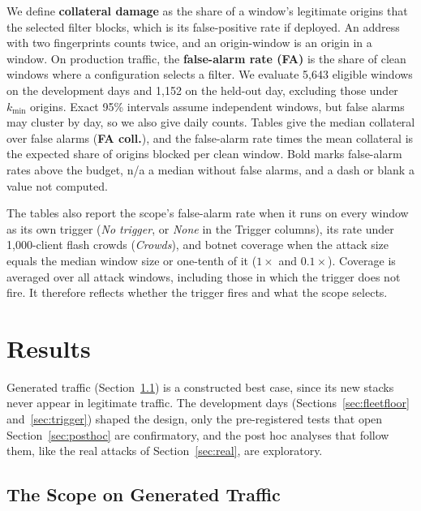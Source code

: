 \documentclass[conference,letterpaper,10pt]{IEEEtran}
\newcommand\1{\textit{(i)}}
\newcommand\2{\textit{(ii)}}
\newcommand\3{\textit{(iii)}}
\newcommand\4{\textit{(iv)}}
\newcommand\5{\textit{(v)}}
\newcommand\6{\textit{(vi)}}
\newcommand\7{\textit{(vii)}}
\newcommand\8{\textit{(viii)}}
\newcommand\9{\textit{(ix)}}
\begin{document}
We define \textbf{collateral damage} as the share of a window's legitimate origins that the selected filter blocks, which is its false-positive rate if deployed. An address with two fingerprints counts twice, and an origin-window is an origin in a window. On production traffic, the \textbf{false-alarm rate (FA)} is the share of clean windows where a configuration selects a filter. We evaluate 5,643 eligible windows on the development days and 1,152 on the held-out day, excluding those under $k_{\min}$ origins. Exact 95\% intervals assume independent windows, but false alarms may cluster by day, so we also give daily counts. Tables give the median collateral over false alarms (\textbf{FA coll.}), and the false-alarm rate times the mean collateral is the expected share of origins blocked per clean window. Bold marks false-alarm rates above the budget, n/a a median without false alarms, and a dash or blank a value not computed.

The tables also report the scope's false-alarm rate when it runs on every window as its own trigger (\textit{No trigger}, or \textit{None} in the Trigger columns), its rate under 1,000-client flash crowds (\textit{Crowds}), and botnet coverage when the attack size equals the median window size or one-tenth of it ($1\times$ and $0.1\times$). Coverage is averaged over all attack windows, including those in which the trigger does not fire. It therefore reflects whether the trigger fires and what the scope selects.

\section{Results}
\label{sec:results}

Generated traffic (Section~\ref{sec:symbolic-detector}) is a constructed best case, since its new stacks never appear in legitimate traffic. The development days (Sections~\ref{sec:fleetfloor} and~\ref{sec:trigger}) shaped the design, only the pre-registered tests that open Section~\ref{sec:posthoc} are confirmatory, and the post hoc analyses that follow them, like the real attacks of Section~\ref{sec:real}, are exploratory.

\subsection{The Scope on Generated Traffic}
\label{sec:symbolic-detector}
\label{sec:collateral}
\label{sec:ablation}
\end{document}
